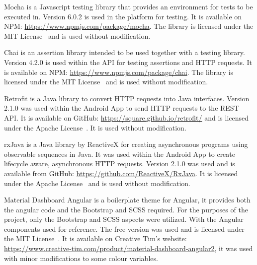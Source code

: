Mocha is a Javascript testing library that provides an environment for tests to be executed in. Version 6.0.2 is used in the platform for testing. It is available on NPM: \url{https://www.npmjs.com/package/mocha}. The library is licensed under the MIT License~\cite{mit_license_ref} and is used without modification.

Chai is an assertion library intended to be used together with a testing library. Version 4.2.0 is used within the API for testing assertions and HTTP requests. It is available on NPM: \url{https://www.npmjs.com/package/chai}. The library is licensed under the MIT License~\cite{mit_license_ref} and is used without modification.

Retrofit is a Java library to convert HTTP requests into Java interfaces. Version 2.1.0 was used within the Android App to send HTTP requests to the REST API. It is available on GitHub: \url{https://square.github.io/retrofit/} and is licensed under the Apache License~\cite{apache_license_ref}. It is used without modification.

rxJava is a Java library by ReactiveX for creating asynchronous programs using observable sequences in Java. It was used within the Android App to create lifecycle aware, asynchronous HTTP requests. Version 2.1.0 was used and is available from GitHub: \url{https://github.com/ReactiveX/RxJava}. It is licensed under the Apache License~\cite{apache_license_ref} and is used without modification.

Material Dashboard Angular is a boilerplate theme for Angular, it provides both the angular code and the Bootstrap and SCSS required. For the purposes of the project, only the Bootstrap and SCSS aspects were utilized. With the Angular components used for reference. The free version was used and is licensed under the MIT License~\cite{mit_license_ref}. It is available on Creative Tim's website: \url{https://www.creative-tim.com/product/material-dashboard-angular2}, it was used with minor modifications to some colour variables.